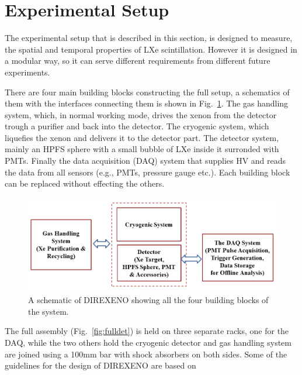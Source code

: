 \section{Experimental Setup}
\label{expSetup}

The experimental setup that is described in this section, is designed to measure, the spatial and 
temporal properties of LXe scintillation. However it is designed in a modular way, so it can serve different 
requirements from different future experiments. 

There are four main building blocks constructing the full setup, a schematics of them with the interfaces 
connecting them is shown in Fig.~\ref{fig:fullschematics}. The gas handling system, which, in normal working mode, 
drives the xenon from the detector trough a purifier and back into the detector. The cryogenic system, which liquefies 
the xenon and delivers it to the detector part. The detector system, mainly an HPFS sphere with a small bubble of LXe 
inside it surronded with PMTs. Finally the data acquisition (DAQ) system that supplies HV and reads the data from all 
sensors (e.g., PMTs, pressure gauge etc.). Each building block can be replaced without effecting the others. 

\begin{figure}[t!]
\centerline{\includegraphics[width=0.8\linewidth]{WholeSys.png}}
\caption{A schematic of DIREXENO showing all the four building blocks of the system.}
\label{fig:fullschematics}
\end{figure}

The full assembly (Fig.~\ref{fig:fulldet}) is held on three separate racks, one for the DAQ, while the two others hold 
the cryogenic detector and gas handling system are joined using a 100mm bar with shock absorbers on both sides. Some of 
the guidelines for the design of DIREXENO are based on~\cite{Giboni}  


